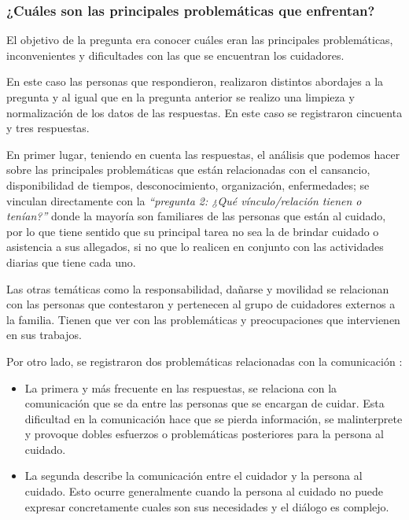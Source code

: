 \documentclass[a4paper,12pt]{article}
\begin{document}
    \subsubsection{¿Cuáles son las principales problemáticas que enfrentan?}
    \par El objetivo de la pregunta era conocer cuáles eran las principales problemáticas, inconvenientes y dificultades con las que se encuentran los cuidadores.
    \par En este caso las personas que respondieron, realizaron distintos abordajes a la pregunta y al igual que en la pregunta anterior se realizo una limpieza y normalización de los datos de las respuestas. En este caso se registraron cincuenta y tres respuestas.
    \newline
    \newline
    \par En primer lugar, teniendo en cuenta las respuestas, el análisis que podemos hacer sobre las principales problemáticas que están relacionadas con el cansancio, disponibilidad de tiempos, desconocimiento, organización, enfermedades; se vinculan directamente con la \textit{“pregunta 2: ¿Qué vínculo/relación tienen o tenían?”} donde la mayoría son familiares de las personas que están al cuidado, por lo que tiene sentido que su principal tarea no sea la de brindar cuidado o asistencia a sus allegados, si no que lo realicen en conjunto con las actividades diarias que tiene cada uno.
    \par Las otras temáticas como la responsabilidad, dañarse y movilidad se relacionan con las personas que contestaron y pertenecen al grupo de cuidadores externos a la familia. Tienen que ver con las problemáticas y preocupaciones que intervienen en sus trabajos.
    \par Por otro lado, se registraron dos problemáticas relacionadas con la comunicación :
    \begin{itemize}
        \item La primera y más frecuente en las respuestas, se relaciona con la comunicación que se da entre las personas que se encargan de cuidar. Esta dificultad en la comunicación hace que se pierda información, se malinterprete y provoque dobles esfuerzos o problemáticas posteriores para la persona al cuidado.
        \item La segunda describe la comunicación entre el cuidador y la persona al cuidado. Esto ocurre generalmente cuando la persona al cuidado no puede expresar concretamente cuales son sus necesidades y el diálogo es complejo.
    \end{itemize}
\end{document}
